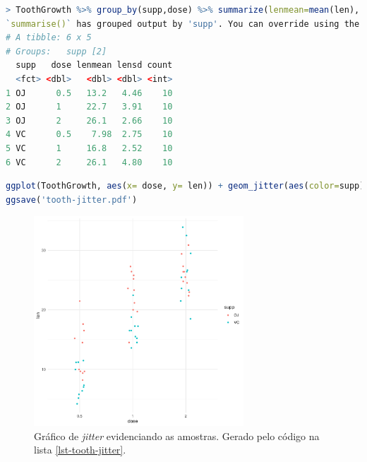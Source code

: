 \begin{frame}
\begin{lstlisting}[language=R, label=lst-tooth-2, caption={Sumário dos dados.}, postbreak=\mbox{$\hookrightarrow$\space}, basicstyle=\fontsize{8}{10}\selectfont\ttfamily]
> ToothGrowth %>% group_by(supp,dose) %>% summarize(lenmean=mean(len), lensd=sd(len), count = n())
`summarise()` has grouped output by 'supp'. You can override using the `.groups` argument.
# A tibble: 6 x 5
# Groups:   supp [2]
  supp   dose lenmean lensd count
  <fct> <dbl>   <dbl> <dbl> <int>
1 OJ      0.5   13.2   4.46    10
2 OJ      1     22.7   3.91    10
3 OJ      2     26.1   2.66    10
4 VC      0.5    7.98  2.75    10
5 VC      1     16.8   2.52    10
6 VC      2     26.1   4.80    10
\end{lstlisting}

\framebreak

\begin{lstlisting}[language=R, label=lst-tooth-jitter, caption={Jitter.}, postbreak=\mbox{$\hookrightarrow$\space}, basicstyle=\fontsize{8}{10}\selectfont\ttfamily]
ggplot(ToothGrowth, aes(x= dose, y= len)) + geom_jitter(aes(color=supp), shape=16, position=position_jitter(0.1)) + theme_minimal()
ggsave('tooth-jitter.pdf')
\end{lstlisting}

\begin{figure}[h]
 \centering
  \includegraphics[width=0.7\textwidth,height=0.7\textheight,keepaspectratio]{figures/tooth-jitter.pdf}
 \caption{Gráfico de \emph{jitter} evidenciando as amostras. Gerado pelo código na lista \ref{lst-tooth-jitter}.}
 \label{fig-tooth-jitter}
\end{figure}



\end{frame}
